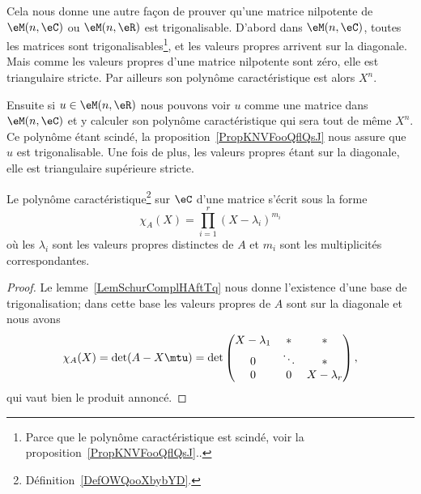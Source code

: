 \begin{remark}  \label{RemREOSooGEDJWX}
    Cela nous donne une autre façon de prouver qu'une matrice nilpotente de \( \eM(n,\eC)\) ou \( \eM(n,\eR)\) est trigonalisable\cite{KDUFooVxwqlC}. D'abord dans \( \eM(n,\eC)\), toutes les matrices sont trigonalisables\footnote{Parce que le polynôme caractéristique est scindé, voir la proposition~\ref{PropKNVFooQflQsJ}..}, et les valeurs propres arrivent sur la diagonale. Mais comme les valeurs propres d'une matrice nilpotente sont zéro, elle est triangulaire stricte. Par ailleurs son polynôme caractéristique est alors \( X^n\).

    Ensuite si \( u\in \eM(n,\eR)\) nous pouvons voir \( u\) comme une matrice dans \( \eM(n,\eC)\) et y calculer son polynôme caractéristique qui sera tout de même \( X^n\). Ce polynôme étant scindé, la proposition~\ref{PropKNVFooQflQsJ} nous assure que \( u\) est trigonalisable. Une fois de plus, les valeurs propres étant sur la diagonale, elle est triangulaire supérieure stricte.
\end{remark}

\begin{corollary}   \label{CorUNZooAZULXT}
    Le polynôme caractéristique\footnote{Définition~\ref{DefOWQooXbybYD}.} sur \( \eC\) d'une matrice s'écrit sous la forme
    \begin{equation}
        \chi_A(X)=\prod_{i=1}^r(X-\lambda_i)^{m_i}
    \end{equation}
    où les \( \lambda_i\) sont les valeurs propres distinctes de \( A\) et \( m_i\) sont les multiplicités correspondantes.
\end{corollary}

\begin{proof}
    Le lemme~\ref{LemSchurComplHAftTq} nous donne l'existence d'une base de trigonalisation; dans cette base les valeurs propres de \( A\) sont sur la diagonale et nous avons
    \begin{equation}
        \chi_A(X)=\det(A-X\mtu)=\det\begin{pmatrix}
            X-\lambda_1    &   *    &   *    \\
            0    &   \ddots    &   *    \\
            0    &   0    &   X-\lambda_r
        \end{pmatrix},
    \end{equation}
    qui vaut bien le produit annoncé.
\end{proof}

